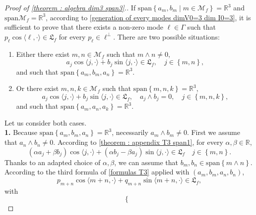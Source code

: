 \documentclass[10pt]{article}
\newcommand{\R}{{\mathbb R}}
\newcommand{\M}{{\mathcal M}}
\newcommand{\la}{\langle}
\newcommand{\ra}{\rangle}
\newcommand{\we}{\wedge}
\begin{document}
\begin{proof}[Proof of \cref{theorem : algebra dim3 span3}.]
    If $\mathrm{span}\left\{a_m,b_m \mid m \in \M_f\right\}=\R^3$ and $\mathrm{span}\M_f=\R^3$, according to \cref{generation of every modes dimV0=3 dim I0=3}, it is sufficient to prove that there exists a non-zero mode $\ell \in \Gamma$ such that $p_\ell \cos \la \ell,\cdot \ra \in \mathfrak{L}_f $ for every $p_{\ell}\in \ell^{\perp}$. There are two possible situations: 
    \begin{enumerate}
        \item[1.] Either there exist $m,n\in \M_f$ such that $m\we n \neq 0$, 
        \begin{equation*}
            a_j\cos \la j,\cdot \ra +b_j \sin \la j,\cdot \ra \in \mathfrak{L}_f, \quad j\in \left\{m,n\right\},
        \end{equation*}
        and such that $\mathrm{span} \left\{a_m,b_m,a_n\right\}=\R^3$. 
        \item[2.] Or there exist $m,n,k\in \M_f$ such that $\mathrm{span} \left\{m,n,k\right\}=\R^3$, 
        \begin{equation}
            a_j \cos \la j,\cdot \ra +b_j \sin \la j,\cdot \ra \in \mathfrak{L}_f, \quad a_j \we b_j =0, \quad j \in \left\{m,n,k\right\},
        \end{equation}
        and such that $\mathrm{span} \left\{a_m,a_n,a_k\right\}=\R^3$.
    \end{enumerate}
    Let us consider both cases. \\
    \textbf{1.} Because $\mathrm{span} \left\{a_m,b_m,a_n\right\}=\R^3$, necessarily $a_m\we b_m \neq 0$. First we assume that $a_n \we b_n \neq 0$. According to \cref{theorem : appendix T3 span1}, for every $\alpha,\beta\in \R$,
    \begin{equation*}
        (\alpha a_j+\beta b_j)\cos \la j,\cdot \ra +(\alpha b_j-\beta a_j)\sin \la j ,\cdot \ra \in \mathfrak{L}_f \quad j \in \left\{m,n\right\}.
    \end{equation*}
    Thanks to an adapted choice of $\alpha,\beta$, we can assume that $b_m,b_n \in \mathrm{span} \left\{m\we n\right\}$. According to the third formula of \cref{formulas T3} applied with $(a_m,b_m,a_n,b_n)$, 
    \begin{equation*}
        p_{m+n}\cos \la m+n,\cdot \ra+q_{m+n}\sin \la m+n,\cdot \ra \in \mathfrak{L}_f, 
    \end{equation*}
    with 
    \begin{equation*}
        \left\{\begin{array}{ll}

\end{array}
\end{equation*}
\end{proof}
\end{document}

